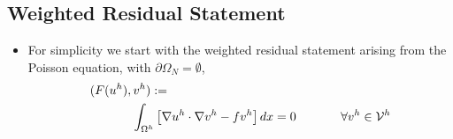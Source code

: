 \subsection*{Weighted Residual Statement}
\begin{frame}%
  \begin{itemize}
  \item {For simplicity we start with the weighted
    residual statement arising from the Poisson equation,
    with $\partial \Omega_N = \emptyset$, 
    \begin{eqnarray}
      \nonumber
      (F( u^h ), v^h) := \hspace{2.5in} \\  \nonumber
      \int_{\Omega^h}  \left[ \nabla u^h \cdot \nabla v^h - fv^h \right] dx %
      =0 \hspace{.5in} \forall v^{h} \in \mathcal{V}^{h}
    \end{eqnarray}
  }
  \end{itemize}
\end{frame}
